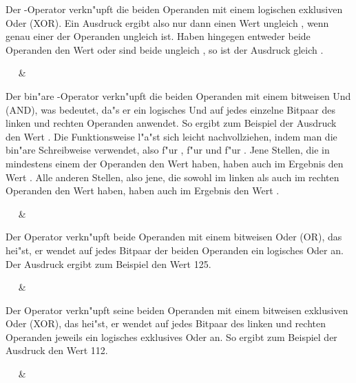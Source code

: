 Der -Operator verkn"upft die beiden Operanden
mit einem logischen exklusiven Oder (XOR). Ein Ausdruck
ergibt also nur dann einen Wert ungleich , wenn genau einer
der Operanden ungleich  ist. Haben hingegen entweder beide
Operanden den Wert  oder sind beide ungleich , so ist der
Ausdruck gleich .

\begin{operator}
\tint\  \tint\ & \tint\
\end{operator}

Der bin"are \fu{\&}-Operator verkn"upft die beiden Operanden mit
einem bitweisen Und (AND), was bedeutet, da"s er ein logisches Und auf
jedes einzelne Bitpaar des linken und rechten Operanden anwendet.
So ergibt zum Beispiel der Ausdruck \fu{93 \& 45} den Wert
. Die Funktionsweise l"a"st sich leicht nachvollziehen,
indem man die bin"are Schreibweise
verwendet, also 
f"ur ,  f"ur  und  f"ur
. Jene Stellen, die in mindestens einem der
Operanden den Wert  haben, haben auch im Ergebnis den Wert
\fu{0}. Alle anderen Stellen, also jene, die sowohl im linken
als auch im rechten Operanden den Wert  haben, haben auch
im Ergebnis den Wert \fu{1}.

\begin{operator}
\tint\  \tint\ & \tint\
\end{operator}

Der Operator \fu{|} verkn"upft beide Operanden mit einem
bitweisen Oder (OR), das hei"st, er wendet auf jedes Bitpaar der
beiden Operanden ein logisches Oder an. Der Ausdruck \fu{93 | 45}
ergibt zum Beispiel den Wert 125.

\begin{operator}
\tint\ \fu{`\char94'} \tint\ & \tint\
\end{operator}
\index{XOR!bitweises|ii}

Der Operator \fu{\char94} verkn"upft seine beiden Operanden mit
einem bitweisen exklusiven Oder (XOR), das hei"st, er wendet auf
jedes Bitpaar des linken und rechten Operanden jeweils ein
logisches exklusives Oder an. So ergibt zum Beispiel der Ausdruck
\fu{93 \char94\ 45} den Wert 112.

\begin{operator}
\tint\  \tint\ & \tint\
\end{operator}

